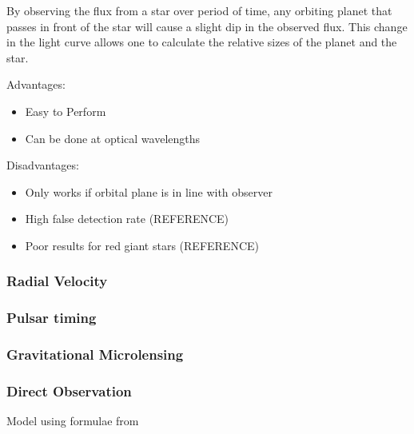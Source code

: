 By observing the flux from a star over period of time, any orbiting planet that passes in front of the star will cause a slight dip in the observed flux. This change in the light curve allows one to calculate the relative sizes of the planet and the star.


Advantages:
\begin{itemize}
    \item Easy to Perform
    \item Can be done at optical wavelengths
\end{itemize}

Disadvantages:
\begin{itemize}
    \item Only works if orbital plane is in line with observer
    \item High false detection rate (REFERENCE)
    \item Poor results for red giant stars (REFERENCE)
\end{itemize}

\subsubsection{Radial Velocity}

\subsubsection{Pulsar timing}

\subsubsection{Gravitational Microlensing}

\subsubsection{Direct Observation}

Model using formulae from \cite{mandel2002analytic}
